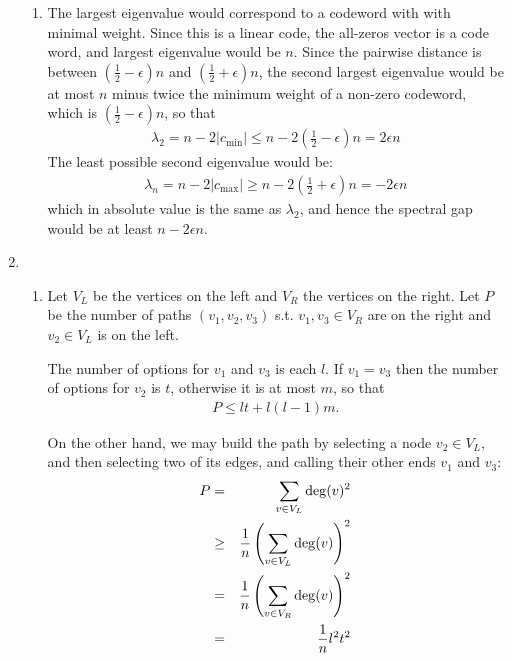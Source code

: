 \documentclass[11pt]{article} \usepackage{amssymb}
\newcommand{\half}{{\textstyle \frac12}}
\begin{document}
\begin{enumerate}
\begin{enumerate}
  \item
  The largest eigenvalue would correspond to a codeword with with minimal
  weight. Since this is a linear code, the all-zeros vector is a code word,
  and largest eigenvalue would be $n$. Since the pairwise distance is between
  $(\half-\epsilon)n$ and $(\half+\epsilon)n$, the second largest eigenvalue would be at most $n$
  minus twice the minimum weight of a non-zero codeword, which is 
  $(\half-\epsilon)n$, so that
  \begin{eqnarray*}
    \lambda_2= n-2|c_{\min}|\leq n-2(\half-\epsilon)n=2\epsilon n
  \end{eqnarray*}
  The least possible second eigenvalue would be:
  \begin{eqnarray*}
    \lambda_n= n-2|c_{\max}|\geq n-2(\half+\epsilon)n=-2\epsilon n
  \end{eqnarray*}
  which in absolute value is the same as $\lambda_2$, and hence the spectral
  gap would be at least $n-2\epsilon n$.
  \end{enumerate}
  \item
    \begin{enumerate}
    \item 
    Let $V_L$ be the vertices on the left and $V_R$ the vertices on the right.
    Let $P$ be the number of paths $(v_1,v_2,v_3)$ s.t. $v_1,v_3\in V_R$ are on the
    right and $v_2\in V_L$ is on the left. 


    The number of options for $v_1$ and $v_3$
    is each $l$. If $v_1=v_3$ then the number of options for $v_2$ is $t$,
    otherwise it is at most $m$, so that
    \begin{eqnarray}
      \label{eq:paths_upper}
      P\leq lt+l(l-1)m.
    \end{eqnarray}

    On the other hand, we may build the path by selecting a node $v_2\in V_L$,
    and then selecting two of its edges, and calling their other ends
    $v_1$ and $v_3$:
   \begin{eqnarray*}
      P&=&\sum_{v\in V_L}\deg(v)^2
      \\ &\geq&{1\over n}\left(\sum_{v\in V_L}\deg(v)\right)^2
      \\ &=&{1\over n}\left(\sum_{v\in V_R}\deg(v)\right)^2
      \\ &=&{1\over n}l^2t^2
    \end{eqnarray*}
    

\end{enumerate}
\end{enumerate}
\end{document}
